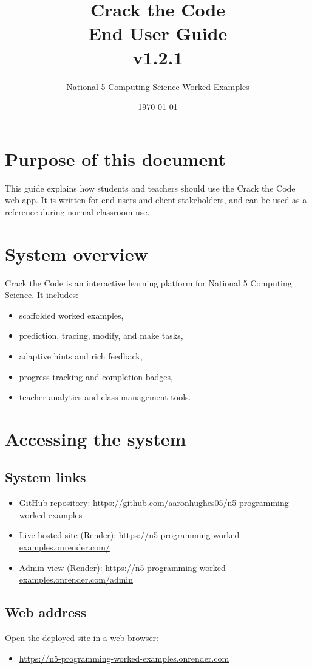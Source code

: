 \documentclass[11pt,a4paper]{article}
\title{\textbf{Crack the Code}\\End User Guide\\v1.2.1}
\author{National 5 Computing Science Worked Examples}
\date{\today}
\begin{document}
\maketitle
\tableofcontents
\newpage

\section{Purpose of this document}
This guide explains how students and teachers should use the Crack the Code web app.
It is written for end users and client stakeholders, and can be used as a reference during normal classroom use.

\section{System overview}
Crack the Code is an interactive learning platform for National 5 Computing Science.
It includes:
\begin{itemize}
  \item scaffolded worked examples,
  \item prediction, tracing, modify, and make tasks,
  \item adaptive hints and rich feedback,
  \item progress tracking and completion badges,
  \item teacher analytics and class management tools.
\end{itemize}

\section{Accessing the system}
\subsection{System links}
\begin{itemize}
  \item GitHub repository: \url{https://github.com/aaronhughes05/n5-programming-worked-examples}
  \item Live hosted site (Render): \url{https://n5-programming-worked-examples.onrender.com/}
  \item Admin view (Render): \url{https://n5-programming-worked-examples.onrender.com/admin}
\end{itemize}

\subsection{Web address}
Open the deployed site in a web browser:
\begin{itemize}
  \item \url{https://n5-programming-worked-examples.onrender.com}
\end{itemize}
\end{document}
